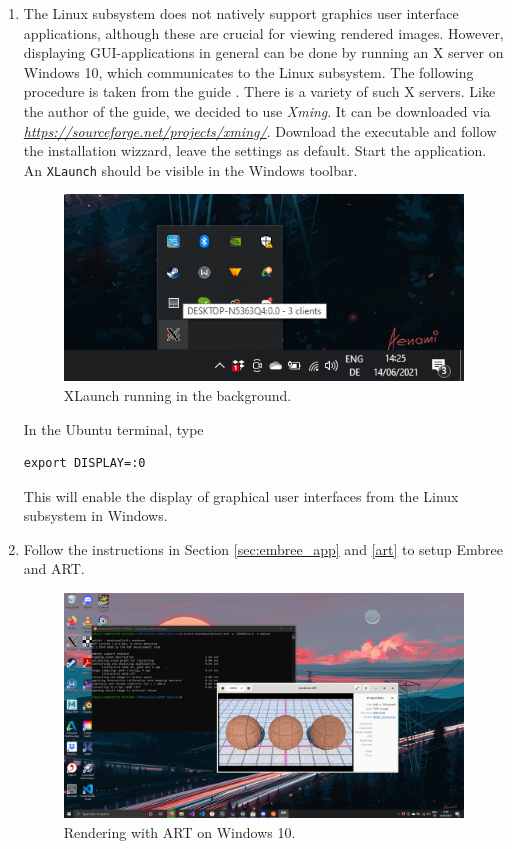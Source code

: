 \begin{enumerate}
	\item The Linux subsystem does not natively support graphics user interface applications, although these are crucial for viewing rendered images. However, displaying GUI-applications in general can be done by running an X server on Windows 10, which communicates to the Linux subsystem. The following procedure is taken from the guide  \cite{windowsSubsystem}. There is a variety of such X servers. Like the author of the guide, we decided to use \emph{Xming}. It can be downloaded via
	\emph{\href{https://sourceforge.net/projects/xming/}{https://sourceforge.net/projects/xming/}}.
	Download the executable and follow the installation wizzard, leave the settings as default. Start the application. An \texttt{XLaunch} should be visible in the Windows toolbar.
	\begin{figure}[h]
		\centering
		\includegraphics[width=.5\linewidth]{img/appendix/xlaunch.png}
		\caption{XLaunch running in the background.}
		\label{fig:xlaunch}
	\end{figure}  
	
	In the Ubuntu terminal, type
	\begin{Verbatim}
export DISPLAY=:0
	\end{Verbatim}
	This will enable the display of graphical user interfaces from the Linux subsystem in Windows.
	
	
	\item Follow the instructions in Section \ref{sec:embree_app} and \ref{art} to setup Embree and ART.
	
\begin{figure}[h]
	\centering
	\includegraphics[width=1\linewidth]{img/appendix/final.png}
	\caption{Rendering with ART on Windows 10.}
	\label{fig:final}
\end{figure}
	
	
\end{enumerate}
